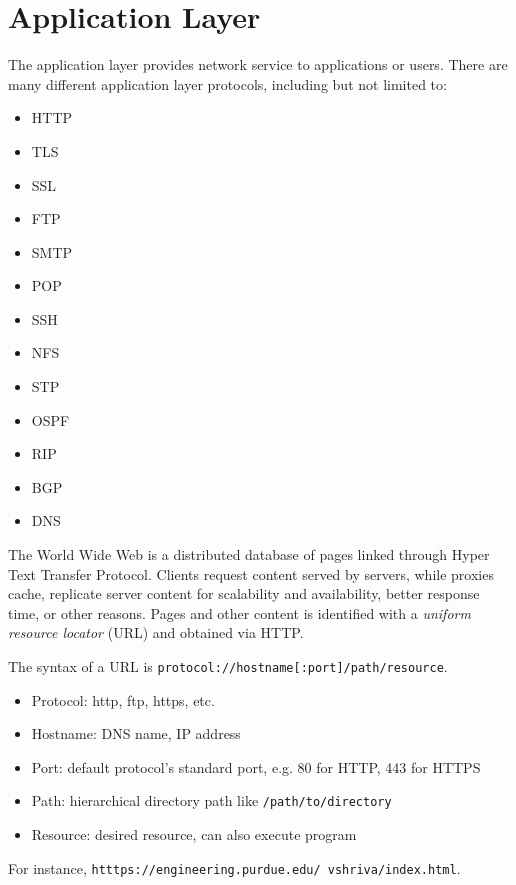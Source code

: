 \section{Application Layer}

The application layer provides network service to applications
or users. There are many different application layer protocols,
including but not limited to:
\begin{itemize}
    \item HTTP
    \item TLS
    \item SSL
    \item FTP
    \item SMTP
    \item POP
    \item SSH
    \item NFS
    \item STP
    \item OSPF
    \item RIP
    \item BGP
    \item DNS
\end{itemize}

The World Wide Web is a distributed database of pages linked through
Hyper Text Transfer Protocol. Clients request content served by servers,
while proxies cache, replicate server content for scalability and
availability, better response time, or other reasons. Pages and other
content is identified with a \emph{uniform resource locator} (URL)
and obtained via HTTP.

The syntax of a URL is \texttt{protocol://hostname[:port]/path/resource}.
\begin{itemize}
    \item Protocol: http, ftp, https, etc.
    \item Hostname: DNS name, IP address
    \item Port: default protocol's standard port, e.g. 80 for HTTP, 443 for HTTPS
    \item Path: hierarchical directory path like \texttt{/path/to/directory}
    \item Resource: desired resource, can also execute program
\end{itemize}
For instance, \texttt{htttps://engineering.purdue.edu/~vshriva/index.html}.


